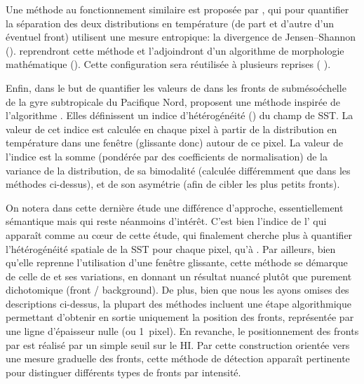 Une méthode au fonctionnement similaire est proposée par \textcite{vazquez_1999}, qui pour quantifier la séparation des deux distributions en température (de part et d'autre d'un éventuel front) utilisent une mesure entropique: la divergence de Jensen--Shannon (\cite{barranco-lopez_1995}).
\textcite{shimada_2005} reprendront cette méthode et l'adjoindront d'un algorithme de morphologie mathématique (\cite{jiang_1997}).
Cette configuration sera réutilisée à plusieurs reprises (\cite{lan_2012} ).

Enfin, dans le but de quantifier les valeurs de  dans les fronts de submésoéchelle de la gyre subtropicale du Pacifique Nord, \textcite{liu_2016} proposent une méthode inspirée de l'algorithme .
Elles définissent un indice d'hétérogénéité () du champ de SST.
La valeur de cet indice est calculée en chaque pixel à partir de la distribution en température dans une fenêtre (glissante donc) autour de ce pixel.
La valeur de l'indice est la somme (pondérée par des coefficients de normalisation) de la variance de la distribution, de sa bimodalité (calculée différemment que dans les méthodes ci-dessus), et de son asymétrie (afin de cibler les plus petits fronts).

On notera dans cette dernière étude une différence d'approche, essentiellement sémantique mais qui reste néanmoins d'intérêt.
C'est bien l'indice de l' qui apparaît comme au cœur de cette étude, qui finalement cherche plus à quantifier l'hétérogénéité spatiale de la SST pour chaque pixel, qu'à .
Par ailleurs, bien qu'elle reprenne l'utilisation d'une fenêtre glissante, cette méthode se démarque de celle de  et ses variations, en donnant un résultat nuancé plutôt que purement dichotomique (front / background).
De plus, bien que nous les ayons omises des descriptions ci-dessus, la plupart des méthodes incluent une étape algorithmique permettant d'obtenir en sortie uniquement la position des fronts, représentée par une ligne d'épaisseur nulle (ou 1~pixel).
En revanche, le positionnement des fronts par \citeauthor{liu_2016} est réalisé par un simple\footnotemark{} seuil sur le HI.
Par cette construction orientée vers une mesure graduelle des fronts, cette méthode de détection apparaît pertinente pour distinguer différents types de fronts par intensité.

